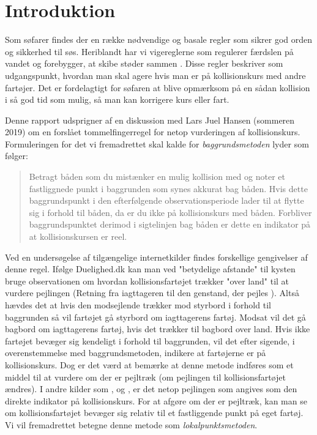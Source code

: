 \documentclass[%
 reprint,
nofootinbib,
aps,
]{revtex4-1}
\begin{document}
\section{Introduktion}
Som søfarer findes der en række nødvendige og basale regler som sikrer god orden og sikkerhed til søs. Heriblandt har vi vigereglerne som regulerer færdslen på vandet og forebygger, at skibe støder sammen \cite{respektforvand}. Disse regler beskriver som udgangspunkt, hvordan man skal agere hvis man er på kollisionskurs med andre fartøjer. Det er fordelagtigt for søfaren at blive opmærksom på en sådan kollision i så god tid som mulig, så man kan korrigere kurs eller fart. \par
Denne rapport udsprigner af en diskussion med Lars Juel Hansen (sommeren 2019) om en forslået tommelfingerregel for netop vurderingen af kollisionskurs. Formuleringen for det vi fremadrettet skal kalde for \textit{baggrundsmetoden} lyder som følger:
\begin{quote}
Betragt båden som du mistænker en mulig kollision med og noter et fastliggnede punkt i baggrunden som synes akkurat bag båden. Hvis dette baggrundspunkt i den efterfølgende observationsperiode lader til at flytte sig i forhold til båden, da er du ikke på kollisionskurs med båden. Forbliver baggrundspunktet derimod i sigtelinjen bag båden er dette en indikator på at kollisionskursen er reel.
\end{quote}
Ved en undersøgelse af tilgængelige internetkilder findes forskellige gengivelser af denne regel. Ifølge Duelighed.dk \cite{duelighed} kan man ved "betydelige afstande" til kysten bruge observationen om hvordan kollisionsfartøjet trækker "over land" til at vurdere pejlingen (Retning fra iagttageren til den genstand, der pejles \cite{ordbog}). Altså hævdes det at hvis den modsejlende trækker mod styrbord i forhold til baggrunden så vil fartøjet gå styrbord om iagttagerens fartøj. Modsat vil det gå bagbord om iagttagerens fartøj, hvis det trækker til bagbord over land. Hvis ikke fartøjet bevæger sig kendeligt i forhold til baggrunden, vil det efter sigende, i overenstemmelse med baggrundsmetoden, indikere at fartøjerne er på kollisionskurs. Dog er det værd at bemærke at denne metode indføres som et middel til at vurdere om der er pejltræk (om pejlingen til kollisionsfartøjet ændres). I andre kilder som \cite{studienoter}, \cite{retsinformation} og \cite{groensund}, er det netop pejlingen som angives som den direkte indikator på kollisionskurs. For at afgøre om der er pejltræk, kan man se om kollisionsfartøjet bevæger sig relativ til et fastliggende punkt på eget fartøj. Vi vil fremadrettet betegne denne metode som \textit{lokalpunktsmetoden}. \par
\end{document}
